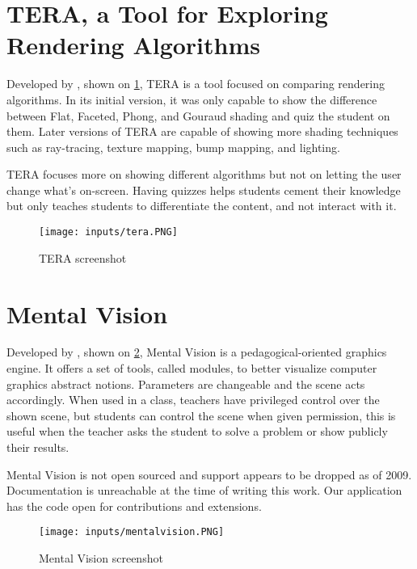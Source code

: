 \documentclass[cic,tc,english]{iiufrgs}
\begin{document}
\section{TERA, a Tool for Exploring Rendering Algorithms}
Developed by \citet{Wolfe1996TERA}, shown on \cref{teraimage}, TERA is a tool focused on comparing rendering algorithms. In its initial version, it was only capable to show the difference between Flat, Faceted, Phong, and Gouraud shading and quiz the student on them. Later versions of TERA are capable of showing more shading techniques such as ray-tracing, texture mapping, bump mapping, and lighting. \cite{Eber2000TERA2}

TERA focuses more on showing different algorithms but not on letting the user change what's on-screen. Having quizzes helps students cement their knowledge but only teaches students to differentiate the content, and not interact with it.

\begin{figure}[hbt!]
    \caption{TERA screenshot}
    \begin{center}
        \texttt{[image: inputs/tera.PNG]}
    \end{center}
    \label{teraimage}
\end{figure}

\section{Mental Vision}
Developed by \citet{Peternier2006mentalvision}, shown on \cref{mentalvisionimage}, Mental Vision is a pedagogical-oriented graphics engine. It offers a set of tools, called modules, to better visualize computer graphics abstract notions. Parameters are changeable and the scene acts accordingly. When used in a class, teachers have privileged control over the shown scene, but students can control the scene when given permission, this is useful when the teacher asks the student to solve a problem or show publicly their results.

Mental Vision is not open sourced and support appears to be dropped as of 2009. Documentation is unreachable at the time of writing this work. Our application has the code open for contributions and extensions.

\begin{figure}[hbt!]
    \caption{Mental Vision screenshot}
    \begin{center}
        \texttt{[image: inputs/mentalvision.PNG]}
    \end{center}
    \label{mentalvisionimage}
\end{figure}
\end{document}
